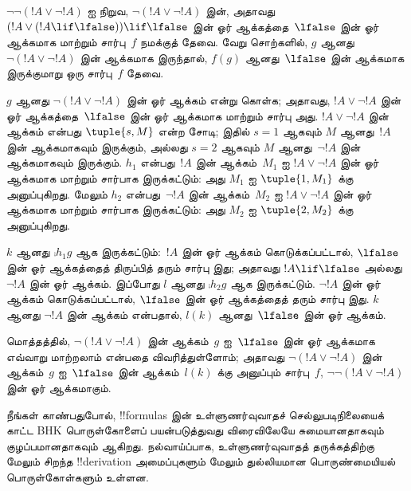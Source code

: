 \documentclass[../../../include/open-logic-section]{subfiles}
\begin{document}
\begin{ex}
$\lnot \lnot (!A \lor \lnot !A)$ ஐ நிறுவ, $\lnot(!A \lor \lnot !A)$
இன், அதாவது $(!A \lor (!A \lif \lfalse)) \lif \lfalse$ இன் ஓர்
ஆக்கத்தை~$\lfalse$ இன் ஓர் ஆக்கமாக மாற்றும் சார்பு~$f$ நமக்குத் தேவை.
வேறு சொற்களில், $g$ ஆனது $\lnot(!A \lor \lnot !A)$ இன் ஆக்கமாக இருந்தால்,
$f(g)$ ஆனது~$\lfalse$ இன் ஆக்கமாக இருக்குமாறு ஒரு சார்பு~$f$ தேவை.

$g$ ஆனது $\lnot(!A \lor \lnot !A)$ இன் ஓர் ஆக்கம் என்று கொள்க; அதாவது,
$!A \lor \lnot !A$ இன் ஓர் ஆக்கத்தை~$\lfalse$ இன் ஓர் ஆக்கமாக மாற்றும்
சார்பு அது. $!A \lor \lnot !A$ இன் ஆக்கம் என்பது $\tuple{s, M}$ என்ற சோடி;
இதில் $s = 1$ ஆகவும் $M$ ஆனது~$!A$ இன் ஆக்கமாகவும் இருக்கும், அல்லது $s = 2$
ஆகவும் $M$ ஆனது~$\lnot !A$ இன் ஆக்கமாகவும் இருக்கும். $h_1$ என்பது~$!A$ இன்
ஆக்கம்~$M_1$ ஐ $!A \lor \lnot !A$ இன் ஓர் ஆக்கமாக மாற்றும் சார்பாக
இருக்கட்டும்: அது $M_1$ ஐ $\tuple{1, M_1}$ க்கு அனுப்புகிறது. மேலும் $h_2$
என்பது~$\lnot !A$ இன் ஆக்கம்~$M_2$ ஐ $!A \lor \lnot !A$ இன் ஓர் ஆக்கமாக
மாற்றும் சார்பாக இருக்கட்டும்: அது $M_2$ ஐ $\tuple{2, M_2}$ க்கு அனுப்புகிறது.

$k$ ஆனது $\comp{h_1}{g}$ ஆக இருக்கட்டும்:~$!A$ இன் ஓர் ஆக்கம்
கொடுக்கப்பட்டால், $\lfalse$ இன் ஓர் ஆக்கத்தைத் திருப்பித் தரும் சார்பு இது;
அதாவது $!A \lif \lfalse$ அல்லது $\lnot !A$ இன் ஓர் ஆக்கம். இப்போது $l$
ஆனது $\comp{h_2}{g}$ ஆக இருக்கட்டும். $\lnot !A$ இன் ஓர் ஆக்கம்
கொடுக்கப்பட்டால், $\lfalse$ இன் ஓர் ஆக்கத்தைத் தரும் சார்பு இது. $k$ ஆனது
$\lnot !A$ இன் ஆக்கம் என்பதால், $l(k)$ ஆனது~$\lfalse$ இன் ஓர் ஆக்கம்.

மொத்தத்தில், $\lnot(!A \lor \lnot !A)$ இன் ஆக்கம்~$g$ ஐ~$\lfalse$ இன் ஓர்
ஆக்கமாக எவ்வாறு மாற்றலாம் என்பதை விவரித்துள்ளோம்; அதாவது $\lnot(!A \lor
\lnot !A)$ இன் ஆக்கம்~$g$ ஐ~$\lfalse$ இன் ஆக்கம்~$l(k)$ க்கு அனுப்பும்
சார்பு~$f$, $\lnot\lnot(!A \lor \lnot !A)$ இன் ஓர் ஆக்கமாகும்.
\end{ex}

நீங்கள் காண்பதுபோல், !!{formula}s இன் உள்ளுணர்வுவாதச் செல்லுபடிநிலையைக்
காட்ட BHK பொருள்கோளைப் பயன்படுத்துவது விரைவிலேயே சுமையானதாகவும்
குழப்பமானதாகவும் ஆகிறது. நல்வாய்ப்பாக, உள்ளுணர்வுவாதத் தருக்கத்திற்கு மேலும்
சிறந்த !!{derivation} அமைப்புகளும் மேலும் துல்லியமான பொருண்மையியல்
பொருள்கோள்களும் உள்ளன.
\end{document}

